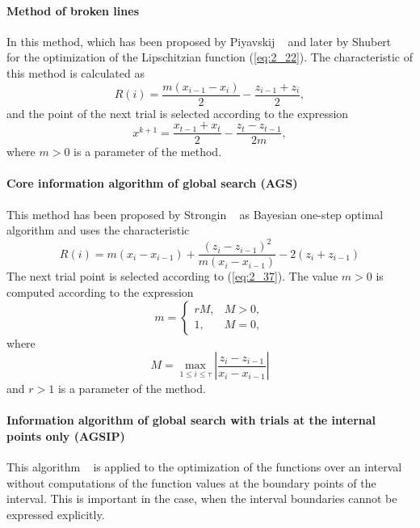 \paragraph{\textbf{Method of broken lines}}
In this method, which has been proposed by Piyavskij  ~\cite{2_Piyavskij} and later by Shubert ~\cite{2_Shubert} for the optimization of the Lipschitzian function (\ref{eq:2_22}). The characteristic of this method is calculated as
\begin{equation}
\label{eq:2_36}
R(i)=\frac{m(x_{i-1}-x_i)}{2}-\frac{z_{i-1}+z_i}{2},
\end{equation}
and the point of the next trial is selected according to the expression
\begin{equation}
\label{eq:2_37}
x^{k+1}=\frac{x_{t-1}+x_t}{2}-\frac{z_t-z_{t-1}}{2m},
\end{equation}
where $m>0$  is a parameter of the method.
\paragraph{\textbf{Core information algorithm of global search (AGS)}}
This method has been proposed by Strongin ~\cite{2_StrMonRus, 2_StrSergMon2000} as Bayesian one-step optimal algorithm and uses the characteristic
\begin{equation}
\label{eq:2_38}
R(i)=m(x_i-x_{i-1})+\frac{(z_i-z_{i-1})^2}{m(x_i-x_{i-1})}-2(z_i+z_{i-1})
\end{equation}
The next trial point is selected according to (\ref{eq:2_37}). 
The value $m>0$  is computed according to the expression
\begin{equation}
\label{eq:2_39}
m =\begin{cases}
    rM, & M>0, \\
    1, & M=0,
  \end{cases} 
\end{equation}
where
\begin{equation}
\label{eq:2_40}
M=\max_{1\leq i\leq \tau}\left|\frac{z_i-z_{i-1}}{x_i-x_{i-1}}\right|
\end{equation}
and $r>1$ is a parameter of the method.
\paragraph{\textbf{Information algorithm of global search with  trials at the internal points only (AGSIP)}}
This algorithm ~\cite{2_SergStrAGSIP} is applied to the optimization of the functions over an interval without computations of the function values at the boundary points of the interval. This is important in the case, when the interval boundaries cannot be expressed explicitly.

